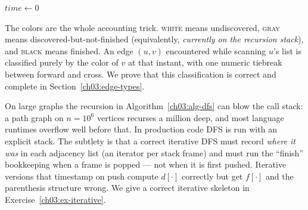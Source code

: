 \begin{algorithm}[H]
\DontPrintSemicolon
{}
\BlankLine
{}
$\mathit{time}\gets 0$\;
\BlankLine
{}
\caption{Depth-first search with timestamps and edge classification}
\label{ch03:alg-dfs}
\end{algorithm}

The colors are the whole accounting trick. \textsc{white} means undiscovered, \textsc{gray} means discovered-but-not-finished (equivalently, \emph{currently on the recursion stack}), and \textsc{black} means finished. An edge $(u,v)$ encountered while scanning $u$'s list is classified purely by the color of $v$ at that instant, with one numeric tiebreak between forward and cross. We prove that this classification is correct and complete in Section~\ref{ch03:edge-types}.

\begin{trapbox}
On large graphs the recursion in Algorithm~\ref{ch03:alg-dfs} can blow the call stack: a path graph on $n=10^6$ vertices recurses a million deep, and most language runtimes overflow well before that. In production code DFS is run with an explicit stack. The subtlety is that a correct iterative DFS must record \emph{where it was} in each adjacency list (an iterator per stack frame) and must run the ``finish'' bookkeeping when a frame is popped --- not when it is first pushed. Iterative versions that timestamp on push compute $d[\cdot]$ correctly but get $f[\cdot]$ and the parenthesis structure wrong. We give a correct iterative skeleton in Exercise~\ref{ch03:ex-iterative}.
\end{trapbox}

